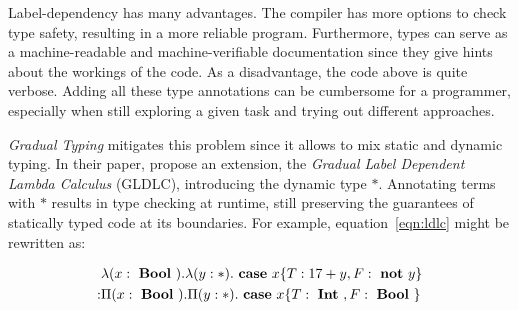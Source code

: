 Label-dependency has many advantages. The compiler has more options to check type safety, resulting in a more reliable program. Furthermore, types can serve as a machine-readable and machine-verifiable documentation since they give hints about the workings of the code.
As a disadvantage, the code above is quite verbose. Adding all these type annotations can be cumbersome for a programmer, especially when still exploring a given task and trying out different approaches.

\emph{Gradual Typing} mitigates this problem since it allows to mix static and dynamic typing. In their paper, \cite{fu2021} propose an extension, the \emph{Gradual Label Dependent Lambda Calculus} (GLDLC), introducing the dynamic type $\ast$. Annotating terms with $\ast$ results in type checking at runtime, still preserving the guarantees of statically typed code at its boundaries. For example, equation~\ref{eqn:ldlc} might be rewritten as:

\begin{equation}
\begin{split}
&\lambda (x: \text{ \textbf{Bool} })
. \lambda (y: *)
. \text{ \textbf{case} } x \{T: 17+y,F: \text{ \textbf{not} } y\} \\
: & \Pi(x : \text{ \textbf{Bool} })
. \Pi (y: *)
. \text{ \textbf{case} } x \{T: \text{ \textbf{Int} }, F: \text{ \textbf{Bool} } \}
\end{split}
\end{equation}

